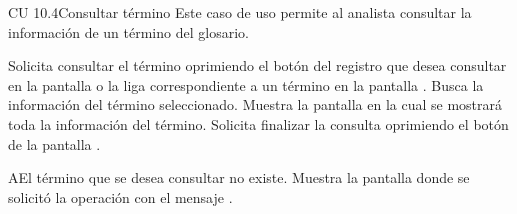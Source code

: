 \newpage 
\begin{UseCase}{CU 10.4}{Consultar término}
	{
		Este caso de uso permite al analista consultar la información de un término del glosario. 
	}
	
	

	


\end{UseCase}
 \begin{UCtrayectoria}
    \UCpaso[\UCactor] Solicita consultar el término oprimiendo el botón \btnConsulta del registro que desea consultar en la pantalla  o la liga correspondiente a un término en la pantalla .
    \UCpaso[\UCsist] Busca la información del término seleccionado. 
    \UCpaso[\UCsist] Muestra la pantalla  en la cual se mostrará toda la información del término.
    \UCpaso[\UCactor] Solicita finalizar la consulta oprimiendo el botón  de la pantalla .
 \end{UCtrayectoria}
 
 \begin{UCtrayectoriaA}{A}{El término que se desea consultar no existe.}
    \UCpaso[\UCsist] Muestra la pantalla donde se solicitó la operación con el mensaje .
 \end{UCtrayectoriaA} 
  